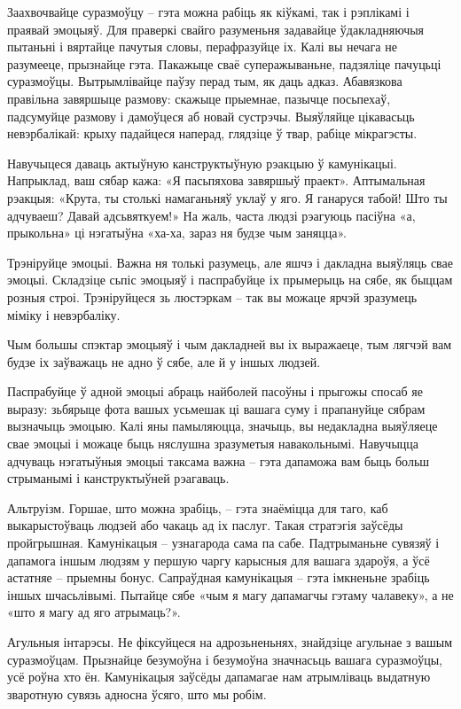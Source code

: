 Заахвочвайце суразмоўцу – гэта можна рабіць як кіўкамі, так і рэплікамі і праявай эмоцыяў. Для праверкі свайго разуменьня задавайце ўдакладняючыя пытаньні і вяртайце пачутыя словы, перафразуйце іх. Калі вы нечага не разумееце, прызнайце гэта. Пакажыце сваё суперажываньне, падзяліце пачуцьці суразмоўцы. Вытрымлівайце паўзу перад тым, як даць адказ. Абавязкова правільна завяршыце размову: скажыце прыемнае, пазычце посьпехаў, падсумуйце размову і дамоўцеся аб новай сустрэчы. Выяўляйце цікавасьць невэрбалікай: крыху падайцеся наперад, глядзіце ў твар, рабіце мікрагэсты.

Навучыцеся даваць актыўную канструктыўную рэакцыю ў камунікацыі. Напрыклад, ваш сябар кажа: «Я пасьпяхова завяршыў праект». Аптымальная рэакцыя: «Крута, ты столькі намаганьняў уклаў у яго. Я ганаруся табой! Што ты адчуваеш? Давай адсьвяткуем!» На жаль, часта людзі рэагуюць пасіўна «а, прыкольна» ці нэгатыўна «ха-ха, зараз ня будзе чым заняцца».

Трэніруйце эмоцыі. Важна ня толькі разумець, але яшчэ і дакладна выяўляць свае эмоцыі. Складзіце сьпіс эмоцыяў і паспрабуйце іх прымерыць на сябе, як быццам розныя строі. Трэніруйцеся зь люстэркам – так вы можаце ярчэй зразумець міміку і невэрбаліку.

Чым большы спэктар эмоцыяў і чым дакладней вы іх выражаеце, тым лягчэй вам будзе іх заўважаць не адно ў сябе, але й у іншых людзей.

Паспрабуйце ў адной эмоцыі абраць найболей пасоўны і прыгожы спосаб яе выразу: зьбярыце фота вашых усьмешак ці вашага суму і прапануйце сябрам вызначыць эмоцыю. Калі яны памыляюцца, значыць, вы недакладна выяўляеце свае эмоцыі і можаце быць няслушна зразуметыя навакольнымі. Навучыцца адчуваць нэгатыўныя эмоцыі таксама важна – гэта дапаможа вам быць больш стрыманымі і канструктыўней рэагаваць.

Альтруізм. Горшае, што можна зрабіць, – гэта знаёміцца для таго, каб выкарыстоўваць людзей або чакаць ад іх паслуг. Такая стратэгія заўсёды пройгрышная. Камунікацыя – узнагарода сама па сабе. Падтрыманьне сувязяў і дапамога іншым людзям у першую чаргу карысныя для вашага здароўя, а ўсё астатняе – прыемны бонус. Сапраўдная камунікацыя – гэта імкненьне зрабіць іншых шчасьлівымі. Пытайце сябе «чым я магу дапамагчы гэтаму чалавеку», а не «што я магу ад яго атрымаць?».

Агульныя інтарэсы. Не фіксуйцеся на адрозьненьнях, знайдзіце агульнае з вашым суразмоўцам. Прызнайце безумоўна і безумоўна значнасьць вашага суразмоўцы, усё роўна хто ён. Камунікацыя заўсёды дапамагае нам атрымліваць выдатную зваротную сувязь адносна ўсяго, што мы робім.

